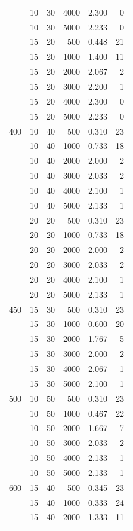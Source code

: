 \begin{longtable}{rrrrrr}
 & 10 & 30 & 4000 & 2.300 & 0 \\
 & 10 & 30 & 5000 & 2.233 & 0 \\
 & 15 & 20 & 500 & 0.448 & 21 \\
 & 15 & 20 & 1000 & 1.400 & 11 \\
 & 15 & 20 & 2000 & 2.067 & 2 \\
 & 15 & 20 & 3000 & 2.200 & 1 \\
 & 15 & 20 & 4000 & 2.300 & 0 \\
 & 15 & 20 & 5000 & 2.233 & 0 \\
\midrule
400 & 10 & 40 & 500 & 0.310 & 23 \\
 & 10 & 40 & 1000 & 0.733 & 18 \\
 & 10 & 40 & 2000 & 2.000 & 2 \\
 & 10 & 40 & 3000 & 2.033 & 2 \\
 & 10 & 40 & 4000 & 2.100 & 1 \\
 & 10 & 40 & 5000 & 2.133 & 1 \\
 & 20 & 20 & 500 & 0.310 & 23 \\
 & 20 & 20 & 1000 & 0.733 & 18 \\
 & 20 & 20 & 2000 & 2.000 & 2 \\
 & 20 & 20 & 3000 & 2.033 & 2 \\
 & 20 & 20 & 4000 & 2.100 & 1 \\
 & 20 & 20 & 5000 & 2.133 & 1 \\
\midrule
450 & 15 & 30 & 500 & 0.310 & 23 \\
 & 15 & 30 & 1000 & 0.600 & 20 \\
 & 15 & 30 & 2000 & 1.767 & 5 \\
 & 15 & 30 & 3000 & 2.000 & 2 \\
 & 15 & 30 & 4000 & 2.067 & 1 \\
 & 15 & 30 & 5000 & 2.100 & 1 \\
\midrule
500 & 10 & 50 & 500 & 0.310 & 23 \\
 & 10 & 50 & 1000 & 0.467 & 22 \\
 & 10 & 50 & 2000 & 1.667 & 7 \\
 & 10 & 50 & 3000 & 2.033 & 2 \\
 & 10 & 50 & 4000 & 2.133 & 1 \\
 & 10 & 50 & 5000 & 2.133 & 1 \\
\midrule
600 & 15 & 40 & 500 & 0.345 & 23 \\
 & 15 & 40 & 1000 & 0.333 & 24 \\
 & 15 & 40 & 2000 & 1.333 & 11 \\

\end{longtable}

